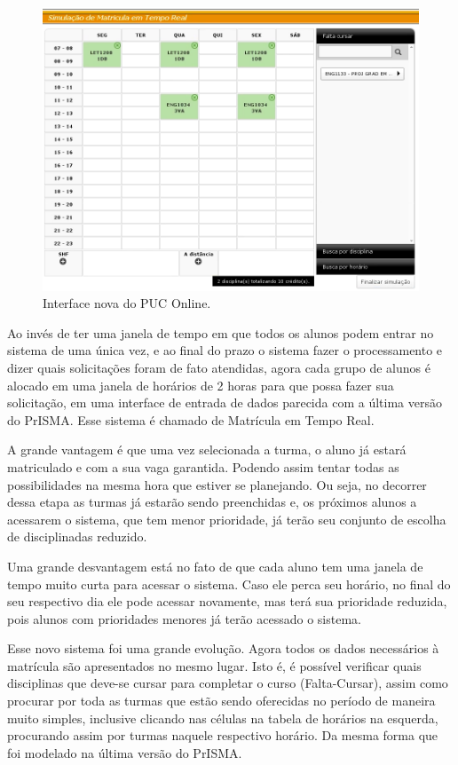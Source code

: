 \documentclass[graduacao,brazil]{ThesisPUC}
\begin{document}
\begin{figure}[H]
    \centering
    \includegraphics[width=\linewidth]{img/puc_online_novo.png}
    \caption{Interface nova do PUC Online.}
\end{figure}

Ao invés de ter uma janela de tempo em que todos os alunos podem entrar no sistema de uma única vez, e ao final do prazo o sistema fazer o processamento e dizer quais solicitações foram de fato atendidas, agora cada grupo de alunos é alocado em uma janela de horários de 2 horas para que possa fazer sua solicitação, em uma interface de entrada de dados parecida com a última versão do PrISMA. Esse sistema é chamado de Matrícula em Tempo Real.

A grande vantagem é que uma vez selecionada a turma, o aluno já estará matriculado e com a sua vaga garantida. Podendo assim tentar todas as possibilidades na mesma hora que estiver se planejando. Ou seja, no decorrer dessa etapa as turmas já estarão sendo preenchidas e, os próximos alunos a acessarem o sistema, que tem menor prioridade, já terão seu conjunto de escolha de disciplinadas reduzido.

Uma grande desvantagem está no fato de que cada aluno tem uma janela de tempo muito curta para acessar o sistema. Caso ele perca seu horário, no final do seu respectivo dia ele pode acessar novamente, mas terá sua prioridade reduzida, pois alunos com prioridades menores já terão acessado o sistema.

Esse novo sistema foi uma grande evolução. Agora todos os dados necessários à matrícula são apresentados no mesmo lugar. Isto é, é possível verificar quais disciplinas que deve-se cursar para completar o curso (Falta-Cursar), assim como procurar por toda as turmas que estão sendo oferecidas no período de maneira muito simples, inclusive clicando nas células na tabela de horários na esquerda, procurando assim por turmas naquele respectivo horário. Da mesma forma que foi modelado na última versão do PrISMA.
\end{document}
